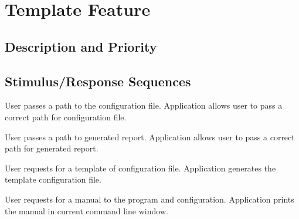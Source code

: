 \section{Template Feature} \label{s:system-features:template-feature}
	\begin{comment}
		$<$Don’t really say “System Feature 1.” State the feature name in just a few 
		words.$>$
	\end{comment}
	
\subsection*{Description and Priority}
	\begin{comment}
		$<$Provide a short description of the feature and indicate whether it is of 
		High, Medium, or Low priority. You could also include specific priority 
		component ratings, such as benefit, penalty, cost, and risk (each rated on a 
		relative scale from a low of 1 to a high of 9).$>$
	\end{comment}

\subsection*{Stimulus/Response Sequences}
	\begin{comment}
		$<$List the sequences of user actions and system responses that stimulate the 
		behavior defined for this feature. These will correspond to the dialog elements 
		associated with use cases.$>$
	\end{comment}
	
	\stimresp
	{User passes a path to the configuration file.}
	{Application allows user to pass a correct path for configuration file.}
	
	\medskip
	
	\stimresp
	{User passes a path to generated report.}
	{Application allows user to pass a correct path for generated report.}
	
	\medskip
	
	\stimresp
	{User requests for a template of configuration file.}
	{Application generates the template configuration file.}
	
	\medskip
	
	\stimresp
	{User requests for a manual to the program and configuration.}
	{Application prints the manual in current command line window.}
